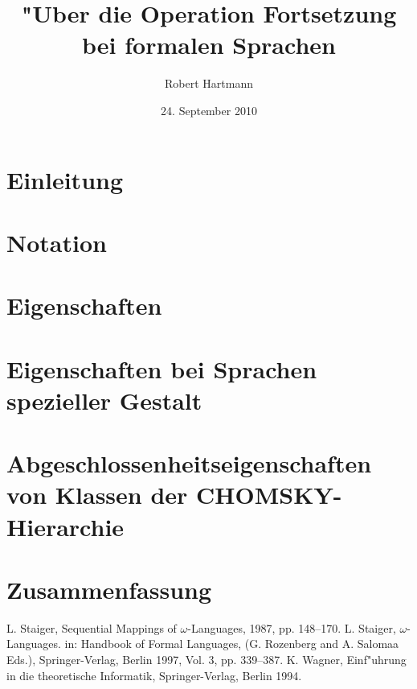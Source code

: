 \documentclass[12pt]{scrreprt}
\author{Robert Hartmann}
\title{"Uber die Operation Fortsetzung bei formalen Sprachen}
\date{24. September 2010}
\theoremstyle{remark}
\begin{document}

%

\pagestyle{plain}
\tableofcontents[hideallsubsections]

\onehalfspacing

\chapter{Einleitung}


\chapter{Notation}


\chapter{Eigenschaften}


\chapter{Eigenschaften bei Sprachen spezieller Gestalt}


\chapter{Abgeschlossenheitseigenschaften von Klassen der CHOMSKY-Hierarchie}


\chapter{Zusammenfassung}



\begin{thebibliography}{9}
L. Staiger, Sequential Mappings of $\omega$-Languages, 1987, pp. 148--170.
L. Staiger, $\omega$-Languages. in: Handbook of Formal Languages, (G. Rozenberg and A. Salomaa Eds.), Springer-Verlag, Berlin 1997, Vol. 3, pp. 339--387.
K. Wagner, Einf"uhrung in die theoretische Informatik, Springer-Verlag, Berlin 1994.

\end{thebibliography}



\end{document}
